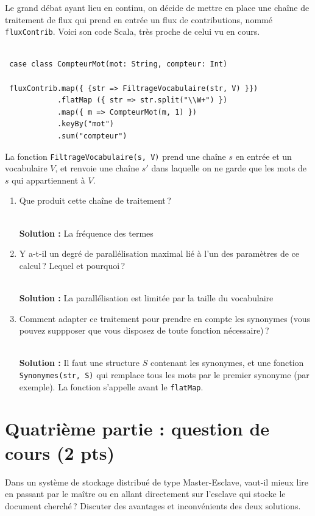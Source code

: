 \documentclass[11pt,a4paper]{article}
\newenvironment{solution}[0]{
~\\ \color{red} \textbf{Solution : }\color{black}}{%
}
\begin{document}
Le grand débat ayant lieu en continu, on décide de mettre en place
une chaîne de traitement de flux qui prend en entrée un flux de contributions, nommé
\texttt{fluxContrib}. Voici son code Scala,
très proche de celui vu en cours.


\begin{verbatim}
 
 case class CompteurMot(mot: String, compteur: Int)
        
 fluxContrib.map({ {str => FiltrageVocabulaire(str, V) }})
            .flatMap ({ str => str.split("\\W+") })
            .map({ m => CompteurMot(m, 1) })
            .keyBy("mot")
            .sum("compteur")
\end{verbatim}

La fonction \texttt{FiltrageVocabulaire(s, V)} prend une chaîne $s$ en entrée et un vocabulaire $V$,
et renvoie une chaîne $s'$ dans laquelle on ne garde que les mots de $s$ qui appartiennent à $V$.

\begin{enumerate}
 \item Que produit cette chaîne de traitement\,?
 

\begin{solution}
La fréquence des termes
\end{solution}
 
 \item  Y a-t-il un degré de parallélisation maximal lié à l'un des paramètres de ce calcul\,? Lequel
 et pourquoi\,?
 
\begin{solution}
La parallélisation est limitée par la taille du vocabulaire
\end{solution}

 \item  Comment adapter ce traitement pour prendre en compte les synonymes (vous pouvez suppposer
    que vous disposez de toute fonction nécessaire)\,?
 
\begin{solution}
Il faut une structure $S$ contenant les synonymes, et une fonction \texttt{Synonymes(str, S)} qui
remplace tous les mots par le premier synonyme (par exemple). La fonction s'appelle avant le 
\texttt{flatMap}.
\end{solution}
\end{enumerate}

\section*{Quatrième partie : question de cours (2 pts)}

Dans un système de stockage distribué de type Master-Esclave, vaut-il mieux lire en passant par
    le maître ou en allant directement sur l'esclave qui stocke le document cherché\,? Discuter
      des avantages et inconvénients des deux solutions.
\end{document}
